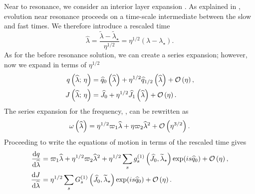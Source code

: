 Near to resonance, we consider an interior layer expansion \citep{Kevorkian1971}. As explained in , evolution near resonance proceeds on a time-scale intermediate between the slow and fast times. We therefore introduce a rescaled time
\begin{equation}
\widehat{\lambda} = \dfrac{\widetilde{\lambda} - \widetilde{\lambda}_\star}{\eta^{1/2}} = \eta^{1/2}(\lambda - \lambda_\star).
\end{equation}
As for the before resonance solution, we can create a series expansion; however, now we expand in terms of $\eta^{1/2}$ \citep{Flanagan2012}
\begin{subequations}
\begin{align}
q\left(\widehat{\lambda};\,\eta\right) = {} & \widehat{q}_0\left(\widehat{\lambda}\right) + \eta^{1/2} \widehat{q}_{1/2}\left(\widehat{\lambda}\right) + \mathcal{O}\left({\eta}\right), \\
J\left(\widehat{\lambda};\,\eta\right) = {} & \widehat{J}_0 + \eta^{1/2} \widehat{J}_1\left(\widehat{\lambda}\right) + \mathcal{O}\left({\eta}\right).
\end{align}
\end{subequations}
The series expansion for the frequency, , can be rewritten as
\begin{equation}
\omega\left(\widehat{\lambda}\right) = \eta^{1/2}\varpi_1\widehat{\lambda} + \eta\varpi_2\widehat{\lambda}^2 + \mathcal{O}\left({\eta^{3/2}}\right).
\label{eq:omega-hat}
\end{equation}
Proceeding to write the equations of motion in terms of the rescaled time gives
\begin{subequations}
\begin{align}
\dfrac{\mathrm{d} {q}}{\mathrm{d} {\widehat{\lambda}}} = {} & \varpi_1\widehat{\lambda} + \eta^{1/2}\varpi_2\widehat{\lambda}^2 + \eta^{1/2}\sum_s g_s^{(1)}\left(\widehat{J}_0,\widetilde{\lambda}_\star\right)\exp(is \widehat{q}_0)  + \mathcal{O}\left({\eta}\right), \\
\dfrac{\mathrm{d} {J}}{\mathrm{d} {\widehat{\lambda}}} = {} & \eta^{1/2}\sum_s G_s^{(1)}\left(\widehat{J}_0,\widetilde{\lambda}_\star\right)\exp(is \widehat{q}_0) + \mathcal{O}\left({\eta}\right).
\end{align}
\end{subequations}

